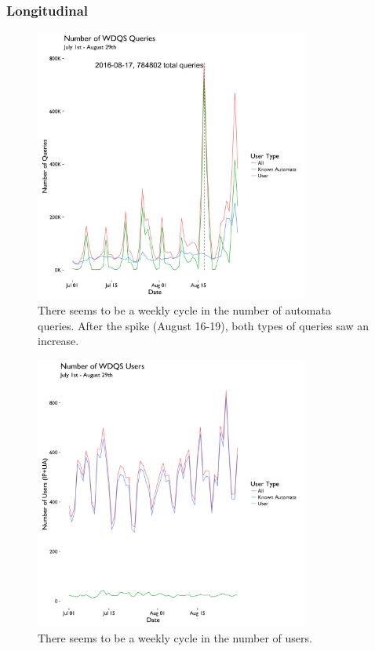 \documentclass[12pt,]{article}
\begin{document}
\subsubsection{Longitudinal}\label{longitudinal}

\begin{figure}[H]
\centering
\includegraphics[width=9cm,height=9cm,keepaspectratio]{figures/all_query_ts.png}
\caption{There seems to be a weekly cycle in the number of automata
queries. After the spike (August 16-19), both types of queries saw an
increase.}
\end{figure}

\begin{figure}[H]
\centering
\includegraphics[width=9cm,height=9cm,keepaspectratio]{figures/all_user_ts.png}
\caption{There seems to be a weekly cycle in the number of users.}
\end{figure}
\end{document}
